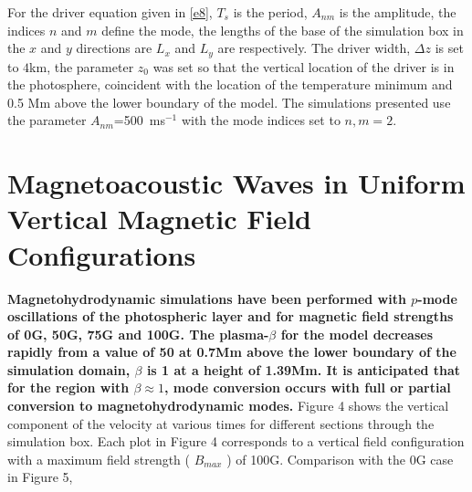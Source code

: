\documentclass[linenumbers]{aastex63}
\newcommand{\bcr}{\bf\color{red}} %
\begin{document}
For the driver equation given in \ref{e8}, $T_{s}$ is the period, $A_{nm}$ is the amplitude, the indices $n$ and $m$ define the mode, the lengths of the base of the simulation box in the $x$ and $y$ directions are $L_{x}$ and $L_{y}$ are  respectively. The driver width, $\Delta z$ is set to $4$km, the parameter $z_{0}$ was set so that the vertical location of the driver is in the photosphere, coincident with the location of the temperature minimum and 0.5 Mm above the lower boundary of the model. The simulations presented use the parameter $A_{nm}$=500\, ms$^{-1}$ with the mode indices set to $n,m=2$. 





\section{Magnetoacoustic Waves in Uniform Vertical Magnetic Field Configurations}
{\bcr
Magnetohydrodynamic simulations have been performed with $p$-mode oscillations of the photospheric layer and for magnetic field strengths of 0G, 50G, 75G and 100G. The plasma-$\beta$ for the model decreases rapidly from a value of 50 at 0.7Mm above the lower boundary of the simulation domain, $\beta$ is 1 at a height of 1.39Mm.  It is anticipated that for the region with $\beta \approx 1$, mode conversion occurs with full or partial conversion to magnetohydrodynamic modes. 
}
 Figure 4 %
 shows the vertical component of the velocity at various times for different sections through the simulation box. Each plot in  Figure 4 %
 corresponds to a vertical field configuration with a maximum field strength ( $ B_{max} $ ) of 100G. Comparison with the 0G case in Figure 5, %
\end{document}
